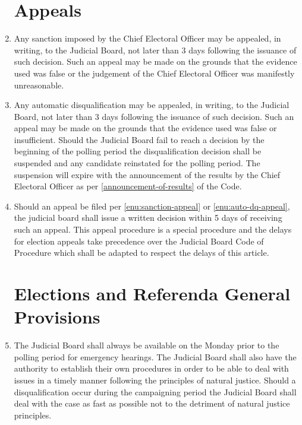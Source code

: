 \documentclass[oneside]{book}
\begin{document}
\begin{enumerate}
\chapter{\label{Appeals}Appeals }
\item \label{enu:sanction-appeal}Any sanction imposed by the Chief Electoral
Officer may be appealed, in writing, to the Judicial Board, not later
than 3 days following the issuance of such decision. Such an appeal
may be made on the grounds that the evidence used was false or the
judgement of the Chief Electoral Officer was manifestly unreasonable.
\item \label{enu:auto-dq-appeal}Any automatic disqualification may be appealed,
in writing, to the Judicial Board, not later than 3 days following
the issuance of such decision. Such an appeal may be made on the grounds
that the evidence used was false or insufficient. Should the Judicial
Board fail to reach a decision by the beginning of the polling period
the disqualification decision shall be suspended and any candidate
reinstated for the polling period. The suspension will expire with
the announcement of the results by the Chief Electoral Officer as
per \autoref{announcement-of-results} of the Code.
\item Should an appeal be filed per \autoref{enu:sanction-appeal} or
\autoref{enu:auto-dq-appeal}, the judicial board shall issue a written
decision within 5 days of receiving such an appeal. This appeal procedure
is a special procedure and the delays for election appeals take precedence
over the Judicial Board Code of Procedure which shall be adapted to
respect the delays of this article.

\chapter{\label{Elections_and_Referenda_General_Provisions}Elections and
Referenda General Provisions }
\item The Judicial Board shall always be available on the Monday prior to
the polling period for emergency hearings. The Judicial Board shall
also have the authority to establish their own procedures in order
to be able to deal with issues in a timely manner following the principles
of natural justice. Should a disqualification occur during the campaigning
period the Judicial Board shall deal with the case as fast as possible
not to the detriment of natural justice principles. 


\end{enumerate}
\end{document}
